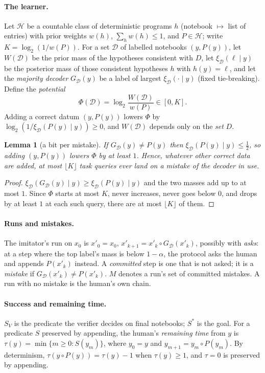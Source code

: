 \documentclass[11pt]{article}
\newtheorem{lemma}[theorem]{Lemma}
\theoremstyle{definition}
\theoremstyle{remark}
\newcommand{\K}{K}
\newcommand{\Hyp}{\mathcal{H}}
\newcommand{\Sv}{S_{V}}
\newcommand{\Sstar}{S^{*}}
\begin{document}
\paragraph{The learner.} Let $\Hyp$ be a countable class of deterministic programs $h$ (notebook $\mapsto$ list of entries) with prior weights $w(h)$, $\sum_h w(h)\le 1$, and $P\in\Hyp$; write $\K = \log_2(1/w(P))$. For a set $\mathcal D$ of labelled notebooks $(y,P(y))$, let $W(\mathcal D)$ be the prior mass of the hypotheses consistent with $D$, let $\xi_{\mathcal D}(\ell\mid y)$ be the posterior mass of those consistent hypotheses $h$ with $h(y)=\ell$, and let the \emph{majority decoder} $G_{\mathcal D}(y)$ be a label of largest $\xi_{\mathcal D}(\cdot\mid y)$ (fixed tie-breaking). Define the \emph{potential}
\[ \Phi(\mathcal D) = \log_2\frac{W(\mathcal D)}{w(P)} \in [0,\K]. \]
Adding a correct datum $(y,P(y))$ lowers $\Phi$ by $\log_2(1/\xi_{\mathcal D}(P(y)\mid y))\ge 0$, and $W(\mathcal D)$ depends only on the \emph{set} $D$.

\begin{lemma}[a bit per mistake]\label{lem:bit}
If $G_{\mathcal D}(y)\ne P(y)$ then $\xi_{\mathcal D}(P(y)\mid y)\le\frac12$, so adding $(y,P(y))$ lowers $\Phi$ by at least $1$. Hence, whatever other correct data are added, at most $\lfloor\K\rfloor$ task queries ever land on a mistake of the decoder in use.
\end{lemma}
\begin{proof}
$\xi_{\mathcal D}(G_{\mathcal D}(y)\mid y)\ge \xi_{\mathcal D}(P(y)\mid y)$ and the two masses add up to at most $1$. Since $\Phi$ starts at most $\K$, never increases, never goes below $0$, and drops by at least $1$ at each such query, there are at most $\lfloor\K\rfloor$ of them.
\end{proof}

\paragraph{Runs and mistakes.} The imitator's run on $x_0$ is $x'_0=x_0$, $x'_{k+1}=x'_k\circ G_{\mathcal D}(x'_k)$, possibly with \emph{asks}: at a step where the top label's mass is below $1-\alpha$, the protocol asks the human and appends $P(x'_k)$ instead. A \emph{committed} step is one that is not asked; it is a \emph{mistake} if $G_{\mathcal D}(x'_k)\ne P(x'_k)$. $M$ denotes a run's set of committed mistakes. A run with no mistake is the human's own chain.

\paragraph{Success and remaining time.} $\Sv$ is the predicate the verifier decides on final notebooks; $\Sstar$ is the goal. For a predicate $S$ preserved by appending, the human's \emph{remaining time} from $y$ is $\tau(y)=\min\{m\ge 0: S(y_m)\}$, where $y_0=y$ and $y_{m+1}=y_m\circ P(y_m)$. By determinism, $\tau(y\circ P(y))=\tau(y)-1$ when $\tau(y)\ge1$, and $\tau=0$ is preserved by appending.
\end{document}
